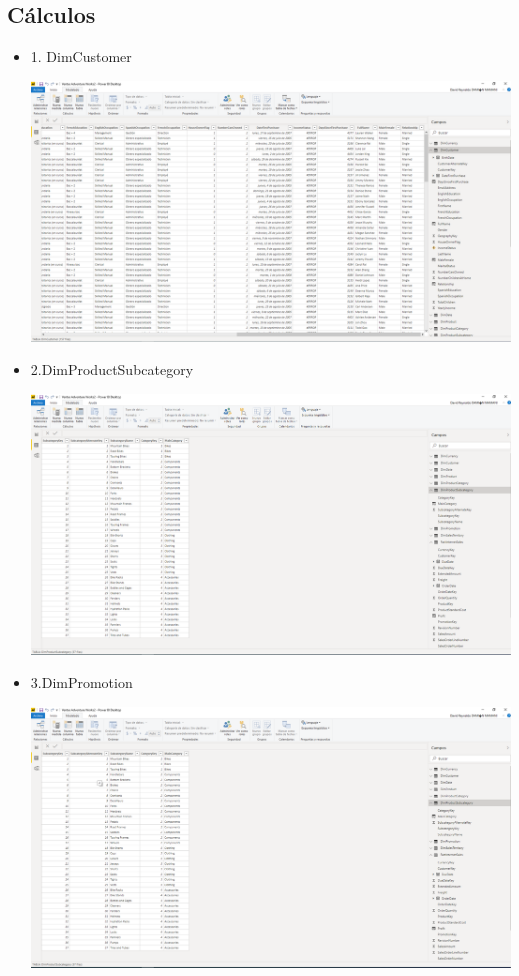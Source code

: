 \subsection {Cálculos}
\begin{itemize}
\item 1. DimCustomer

	\begin{center}
	\includegraphics[width=18cm]{./Imagenes/Imagen3}
	\end{center}	


 \item 2.DimProductSubcategory

	\begin{center}
	\includegraphics[width=18cm]{./Imagenes/Imagen4}
	\end{center}	

 \item 3.DimPromotion

	\begin{center}
	\includegraphics[width=18cm]{./Imagenes/Imagen5}
	\end{center}	



\end{itemize}
